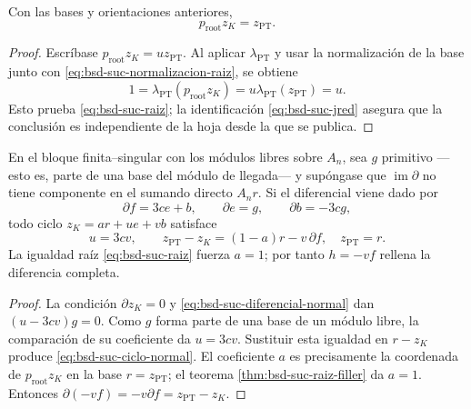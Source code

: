 \begin{theorem}
\label{thm:bsd-suc-raiz-filler}
Con las bases y orientaciones anteriores,
\begin{equation}\label{eq:bsd-suc-raiz}
 p_{\mathrm{root}}z_K=z_{\mathrm{PT}}.
\end{equation}
\end{theorem}

\begin{proof}
Escríbase
\(p_{\mathrm{root}}z_K=u z_{\mathrm{PT}}\). Al aplicar
\(\lambda_{\mathrm{PT}}\) y usar la normalización de la base junto con
\eqref{eq:bsd-suc-normalizacion-raiz}, se obtiene
\[
 1=\lambda_{\mathrm{PT}}(p_{\mathrm{root}}z_K)
  =u\lambda_{\mathrm{PT}}(z_{\mathrm{PT}})=u.
\]
Esto prueba \eqref{eq:bsd-suc-raiz}; la identificación
\eqref{eq:bsd-suc-jred} asegura que la conclusión es independiente de la
hoja desde la que se publica.
\end{proof}

\begin{lemma}
\label{lem:bsd-suc-forma-normal}
En el bloque finita--singular con
los módulos libres sobre \(A_n\), sea \(g\) primitivo ---esto es, parte de una
base del módulo de llegada--- y supóngase que
\(\operatorname{im}\partial\) no tiene componente en el sumando directo
\(A_n r\). Si el diferencial viene dado por
\begin{equation}\label{eq:bsd-suc-diferencial-normal}
 \partial f=3c e+b,
 \qquad \partial e=g,
 \qquad \partial b=-3c g,
\end{equation}
todo ciclo \(z_K=a r+u e+v b\) satisface
\begin{equation}\label{eq:bsd-suc-ciclo-normal}
 u=3cv,
 \qquad
 z_{\mathrm{PT}}-z_K=(1-a)r-v\,\partial f,
 \quad z_{\mathrm{PT}}=r.
\end{equation}
La igualdad raíz \eqref{eq:bsd-suc-raiz} fuerza \(a=1\); por tanto
\(h=-vf\) rellena la diferencia completa.
\end{lemma}

\begin{proof}
La condición \(\partial z_K=0\) y
\eqref{eq:bsd-suc-diferencial-normal} dan
\((u-3cv)g=0\). Como \(g\) forma parte de una base de un módulo libre,
la comparación de su coeficiente da \(u=3cv\). Sustituir esta igualdad en
\(r-z_K\) produce \eqref{eq:bsd-suc-ciclo-normal}. El coeficiente \(a\)
es precisamente la coordenada de \(p_{\mathrm{root}}z_K\) en la base
\(r=z_{\mathrm{PT}}\); el teorema \ref{thm:bsd-suc-raiz-filler} da
\(a=1\). Entonces
\(\partial(-vf)=-v\partial f=z_{\mathrm{PT}}-z_K\).
\end{proof}

